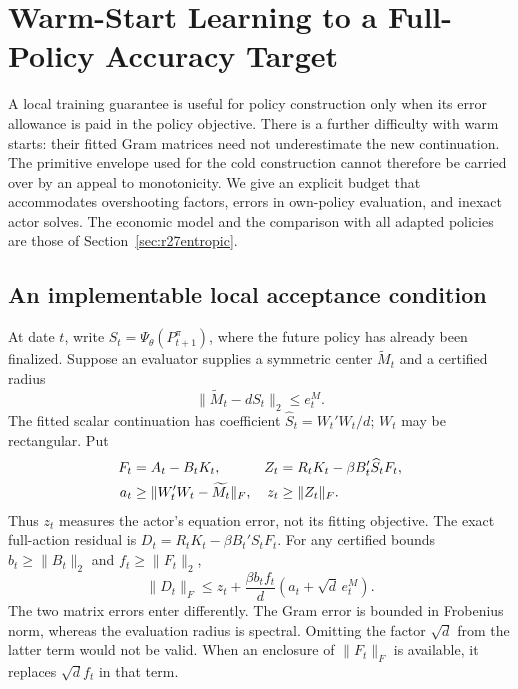 \section{Warm-Start Learning to a Full-Policy Accuracy Target}
\label{sec:r34robust}
A local training guarantee is useful for policy construction only when its
error allowance is paid in the policy objective. There is a further difficulty
with warm starts: their fitted Gram matrices need not underestimate the new
continuation. The primitive envelope used for the cold construction cannot
therefore be carried over by an appeal to monotonicity. We give an explicit
budget that accommodates overshooting factors, errors in own-policy
evaluation, and inexact actor solves. The economic model and the comparison
with all adapted policies are those of Section~\ref{sec:r27entropic}.

\subsection{An implementable local acceptance condition}
At date $t$, write $S_t=\Psi_\theta(P_{t+1}^{\pi})$, where the future policy
has already been finalized. Suppose an evaluator supplies a symmetric center
$\widetilde M_t$ and a certified radius
\[
 \|\widetilde M_t-dS_t\|_2\leq e_t^M.
\]
The fitted scalar continuation has coefficient
$\widehat S_t=W_t'W_t/d$; $W_t$ may be rectangular. Put
\begin{align}
 F_t&=A_t-B_tK_t,&
 Z_t&=R_tK_t-\beta B_t'\widehat S_tF_t,\notag\\
 a_t&\geq\|W_t'W_t-\widetilde M_t\|_F,&
 z_t&\geq\|Z_t\|_F.\label{eq:r34localdata}
\end{align}
Thus $z_t$ measures the actor's equation error, not its fitting objective.
The exact full-action residual is
$D_t=R_tK_t-\beta B_t'S_tF_t$. For any certified bounds
$b_t\geq\|B_t\|_2$ and $f_t\geq\|F_t\|_2$,
\begin{equation}\label{eq:r34mixed}
 \|D_t\|_F\leq z_t+
 \frac{\beta b_tf_t}{d}(a_t+\sqrt d\,e_t^M).
\end{equation}
The two matrix errors enter differently. The Gram error is bounded in
Frobenius norm, whereas the evaluation radius is spectral. Omitting the
factor $\sqrt d$ from the latter term would not be valid. When an enclosure
of $\|F_t\|_F$ is available, it replaces $\sqrt d f_t$ in that term.

